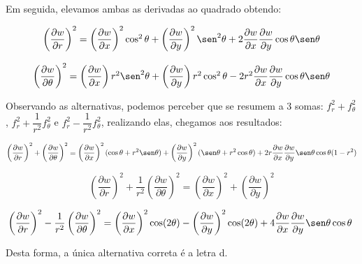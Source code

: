 Em seguida, elevamos ambas as derivadas ao quadrado obtendo:

\begin{center}
$$
\begin{array}{c}
	\left(\dfrac{\partial w}{\partial r}\right)^2 =
	\left(\dfrac{\partial w}{\partial x}\right)^2 \cos ^2 \theta +
	\left(\dfrac{\partial w}{\partial y}\right)^2 \sen ^2 \theta +
	2 \dfrac{\partial w}{\partial x} \dfrac{\partial w}{\partial y}
	\cos \theta \sen \theta \\ \\
	\left(\dfrac{\partial w}{\partial \theta}\right)^2 =
	\left(\dfrac{\partial w}{\partial x}\right) r^2 \sen ^2 \theta +
	\left(\dfrac{\partial w}{\partial y}\right) r^2 \cos ^2 \theta - 
	2r^2 \dfrac{\partial w}{\partial x} \dfrac{\partial w}{\partial y}
	\cos \theta \sen \theta
\end{array}
$$
\end{center}

Observando as alternativas, podemos perceber que se resumem
a 3 somas: $f_r^2+f_{\theta}^2$, $f_r^2+\dfrac{1}{r^2}f_{\theta}^2$ e
$f_r^2-\dfrac{1}{r^2}f_{\theta}^2$, realizando elas, chegamos aos resultados:

$$
\left( \dfrac{\partial w}{\partial r}\right)^2 +
\left( \dfrac{\partial w}{\partial \theta}\right)^2 = 
\left( \dfrac{\partial w}{\partial x}\right)^2
(\cos \theta + r^2 \sen \theta) +
\left( \dfrac{\partial w}{\partial y}\right)^2
(\sen \theta + r^2 \cos \theta) +
2r\dfrac{\partial w}{\partial x} \dfrac{\partial w}{\partial y}
\sen \theta \cos \theta (1 - r^2)
$$ 

$$
\left( \dfrac{\partial w}{\partial r}\right)^2 +
\dfrac{1}{r^2}\left( \dfrac{\partial w}{\partial \theta}\right)^2 =
\left( \dfrac{\partial w}{\partial x}\right)^2 +
\left( \dfrac{\partial w}{\partial y}\right)^2
$$

$$
\left( \dfrac{\partial w}{\partial r}\right)^2 -
\dfrac{1}{r^2}\left( \dfrac{\partial w}{\partial \theta}\right)^2 =
\left( \dfrac{\partial w}{\partial x}\right)^2
\cos (2\theta) -
\left( \dfrac{\partial w}{\partial y}\right)^2
\cos (2\theta) +
4\dfrac{\partial w}{\partial x} \dfrac{\partial w}{\partial y}
\sen \theta \cos \theta
\
$$

Desta forma, a única alternativa correta é a letra d.